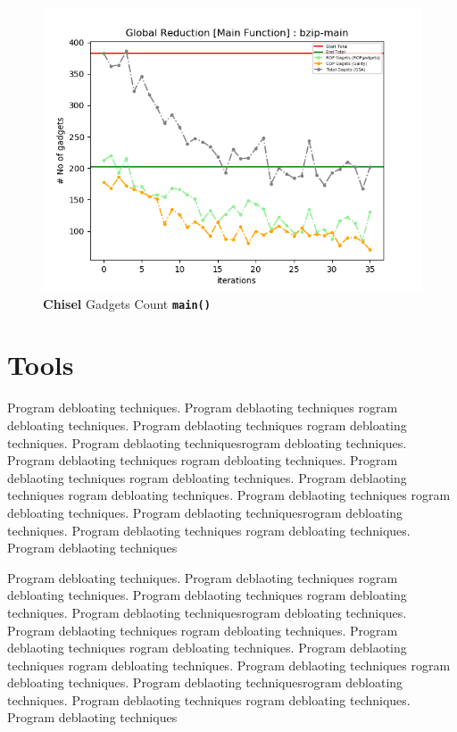 \documentclass{relatorio}
\begin{document}
\begin{figure}[H]
	\includegraphics[width=1\linewidth]{imgs/plots/chisel_gadgets_bzip-main_plot.png}
	\caption{\textbf{Chisel} Gadgets Count \textbf{\texttt{main()}}}%
	\label{fig:plant}
\end{figure}
	\section{Tools}%
\label{Tools}

Program debloating techniques. Program deblaoting techniques rogram debloating techniques. Program deblaoting techniques
rogram debloating techniques. Program deblaoting techniquesrogram debloating techniques. Program deblaoting techniques
rogram debloating techniques. Program deblaoting techniques rogram debloating techniques. Program deblaoting techniques
rogram debloating techniques. Program deblaoting techniques 
rogram debloating techniques. Program deblaoting techniquesrogram debloating techniques. Program deblaoting techniques
rogram debloating techniques. Program deblaoting techniques

Program debloating techniques. Program deblaoting techniques rogram debloating techniques. Program deblaoting techniques
rogram debloating techniques. Program deblaoting techniquesrogram debloating techniques. Program deblaoting techniques
rogram debloating techniques. Program deblaoting techniques rogram debloating techniques. Program deblaoting techniques
rogram debloating techniques. Program deblaoting techniques 
rogram debloating techniques. Program deblaoting techniquesrogram debloating techniques. Program deblaoting techniques
rogram debloating techniques. Program deblaoting techniques
\end{document}
